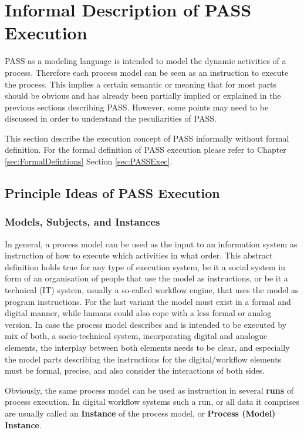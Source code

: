 \newpage

\section{Informal Description of PASS Execution}
\label{sec:informalExecution}

PASS as a modeling language is intended to model the dynamic activities of a process. Therefore each process model can be seen as an instruction to execute the process. This implies a certain semantic or meaning that for most parts should be obvious and has already been partially implied or explained in the previous sections describing PASS. However, some  points may need to be discussed in order to understand the peculiarities of PASS. 

This section describe the execution concept of PASS informally  without formal definition. For the formal definition of PASS execution please refer to Chapter \ref{sec:FormalDefintions} Section \ref{sec:PASSExec}.

\subsection{Principle Ideas of PASS Execution}

\subsubsection{Models, Subjects, and Instances}
\label{sec:modelSubjectInstance}

In general, a process model can be used as the input to an information system as instruction of how to execute which activities in what order. This abstract definition holds true for any type of execution system, be it a social system in form of an organisation of people that use the model as instructions, or be it a technical (IT) system, usually a so-called workflow engine, that uses the model as program instructions. For the last variant the model must exist in a formal and digital manner, while humans could also cope with a less formal or analog version. In case the process model describes and is intended to be executed by mix of both, a socio-technical system, incorporating digital and analogue elements, the interplay between both elements needs to be clear, and especially the model parts describing the instructions for the digital/workflow elements must be formal, precise, and also consider the interactions of both sides.

Obviously, the same process model can be used as instruction in several \textbf{runs} of process execution. In digital workflow systems such a run, or all data it comprises are usually called an \textbf{Instance} of the process model, or \textbf{Process (Model) Instance}.

